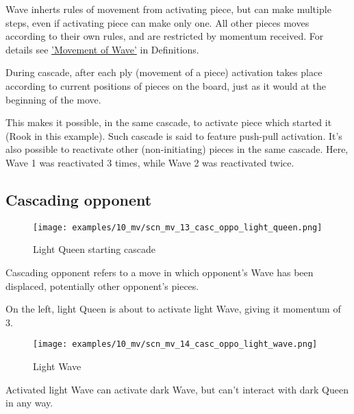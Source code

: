 Wave inherts rules of movement from activating piece, but can make multiple
steps, even if activating piece can make only one. All other pieces moves
according to their own rules, and are restricted by momentum received. For
details see \hyperref[sec:Definitions/Movement of Wave]{'Movement of Wave'} in
Definitions.

During cascade, after each ply (movement of a piece) activation takes place
according to current positions of pieces on the board, just as it would at the
beginning of the move.

\label{txt:Miranda's veil/Cascading Waves/Push-pull activation}
This makes it possible, in the same cascade, to activate piece which started it
(Rook in this example). Such cascade is said to feature push-pull activation.
It's also possible to reactivate other (non-initiating) pieces in the same
cascade. Here, Wave 1 was reactivated 3 times, while Wave 2 was reactivated
twice.

\clearpage %

\subsection*{Cascading opponent}

\noindent
\begin{wrapfigure}[10]{l}{0.5625\textwidth}
\centering
\texttt{[image: examples/10\_mv/scn\_mv\_13\_casc\_oppo\_light\_queen.png]}
\caption{Light Queen starting cascade}
\label{fig:scn_mv_13_casc_oppo_light_queen}
\end{wrapfigure}
Cascading opponent refers to a move in which opponent's Wave has been displaced,
potentially other opponent's pieces.

On the left, light Queen is about to activate light Wave, giving it momentum of 3.

\vspace*{0.155\textheight}
\noindent
\begin{wrapfigure}[5]{r}{0.5625\textwidth}
\centering
\texttt{[image: examples/10\_mv/scn\_mv\_14\_casc\_oppo\_light\_wave.png]}
\caption{Light Wave}
\label{fig:scn_mv_14_casc_oppo_light_wave}
\end{wrapfigure}
Activated light Wave can activate dark Wave, but can't interact with dark Queen in
any way.

